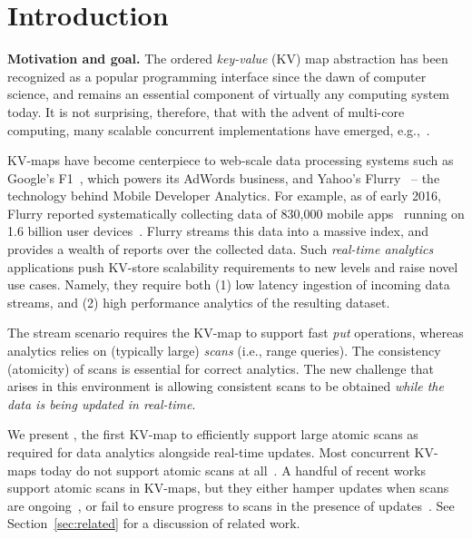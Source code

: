 \section{Introduction}
\label{sec:intro}

{\bf{Motivation and goal.}} The ordered \emph{key-value} (KV) map abstraction has been recognized as a popular programming interface
since the dawn of computer science, and remains an essential component of virtually any computing system today.
It is not surprising, therefore, that with the advent of multi-core computing,  many scalable concurrent
implementations have emerged,
e.g.,~\cite{JavaConcurrentSkipList,LinkedListBP,BraginskyP2012,Hendler04,Kogan12,NatarajanM2014}.

KV-maps have become centerpiece to web-scale data processing systems such as
Google's F1~\cite{Shute2013}, which powers its AdWords
business, and Yahoo's Flurry~\cite{flurry} --
the technology behind Mobile Developer Analytics.
For example,
as of early 2016,  Flurry  reported systematically collecting data of 830\!,000 mobile
apps~\cite{appmatrix}
running on 1.6 billion
user devices~\cite{phablet}.
Flurry streams  this data into a massive index, and provides
a wealth of reports over the collected data.
Such
\emph{real-time analytics}  applications push KV-store scalability requirements to new levels and raise novel use cases.
Namely, they require
both
(1) low latency ingestion of incoming data streams, and (2) high performance analytics of the resulting dataset.

The stream scenario requires the KV-map to support fast \emph{put} operations,
whereas  analytics  relies on (typically large) \emph{scans} (i.e., range queries).
The consistency (atomicity) of scans is essential for correct analytics.
The new challenge that arises in this environment is allowing consistent scans
to be obtained \emph{while the data is being updated in real-time}.

We present {\kiwi}, the first KV-map to efficiently support large atomic
scans as required for data analytics alongside real-time updates.
Most concurrent KV-maps today do not support atomic scans at all~\cite{JavaConcurrentSkipList,LinkedListBP,BraginskyP2012,Hendler04,NatarajanM2014,Kogan12,Lomet13,ArbelGHK15}.
A handful of recent works support atomic scans in KV-maps, but they either
hamper updates when scans are ongoing~\cite{BronsonCCO2010,Prokopec12},
or fail to ensure progress to scans in the presence of updates~\cite{BrownA12}.
See Section~\ref{sec:related} for a discussion of related work.

